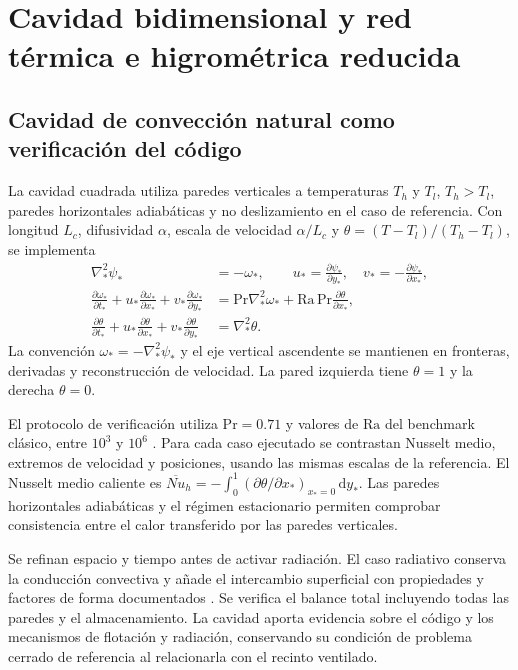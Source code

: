 \section{Cavidad bidimensional y red térmica e higrométrica reducida}
\label{met:modelos_complementarios}

\subsection{Cavidad de convección natural como verificación del código}
\label{met:cavidad}

La cavidad cuadrada utiliza paredes verticales a temperaturas $T_h$ y $T_l$, $T_h>T_l$, paredes horizontales adiabáticas y no deslizamiento en el caso de referencia. Con longitud $L_c$, difusividad $\alpha$, escala de velocidad $\alpha/L_c$ y $\theta=(T-T_l)/(T_h-T_l)$, se implementa
\begin{align}
\nabla_*^2\psi_*&=-\omega_*,\qquad
u_*=\frac{\partial\psi_*}{\partial y_*},\quad
v_*=-\frac{\partial\psi_*}{\partial x_*},
\label{met:cavidad_poisson}\\
\frac{\partial\omega_*}{\partial t_*}+u_*\frac{\partial\omega_*}{\partial x_*}
+v_*\frac{\partial\omega_*}{\partial y_*}
&=\mathrm{Pr}\nabla_*^2\omega_*+\mathrm{Ra}\,\mathrm{Pr}\frac{\partial\theta}{\partial x_*},
\label{met:cavidad_vorticidad}\\
\frac{\partial\theta}{\partial t_*}+u_*\frac{\partial\theta}{\partial x_*}
+v_*\frac{\partial\theta}{\partial y_*}&=\nabla_*^2\theta.
\label{met:cavidad_energia}
\end{align}
La convención $\omega_*=-\nabla_*^2\psi_*$ y el eje vertical ascendente se mantienen en fronteras, derivadas y reconstrucción de velocidad. La pared izquierda tiene $\theta=1$ y la derecha $\theta=0$.

El protocolo de verificación utiliza $\mathrm{Pr}=0.71$ y valores de $\mathrm{Ra}$ del benchmark clásico, entre $10^3$ y $10^6$ \cite{devahl1983}. Para cada caso ejecutado se contrastan Nusselt medio, extremos de velocidad y posiciones, usando las mismas escalas de la referencia. El Nusselt medio caliente es $\overline{Nu}_h=-\int_0^1(\partial\theta/\partial x_*)_{x_*=0}\,\mathrm dy_*$. Las paredes horizontales adiabáticas y el régimen estacionario permiten comprobar consistencia entre el calor transferido por las paredes verticales.

Se refinan espacio y tiempo antes de activar radiación. El caso radiativo conserva la conducción convectiva y añade el intercambio superficial con propiedades y factores de forma documentados \cite{balaji1993}. Se verifica el balance total incluyendo todas las paredes y el almacenamiento. La cavidad aporta evidencia sobre el código y los mecanismos de flotación y radiación, conservando su condición de problema cerrado de referencia al relacionarla con el recinto ventilado.

